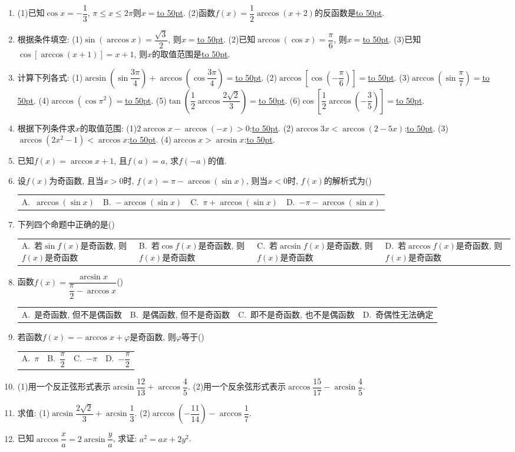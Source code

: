 \documentclass[10pt,a4paper]{article}
\newcommand{\blank}[1]{\underline{\hbox to #1pt{}}}
\newcommand{\fourch}[4]{\par\begin{tabular}{p{.23\textwidth}p{.23\textwidth}p{.23\textwidth}p{.23\textwidth}}
A.~#1 &B.~#2& C.~#3& D.~#4
\end{tabular}}
\begin{document}
\begin{enumerate}[1.]
(3)$y=\arccos \dfrac 2x$, $x\in$\blank{50}, $y\in$\blank{50}.
(4)$y=\arccos (2x^2-x)$, $x\in$\blank{50}, $y\in$\blank{50}.
(5)$y=\sqrt {\dfrac{2\pi }3-\arccos (\dfrac 12x-1)}$, $x\in$\blank{50}, $y\in$\blank{50}.
\item (1)已知$\cos x=-\dfrac 13$, $\pi \le x\le 2\pi$则$x=$\blank{50}.
(2)函数$f(x)=\dfrac 12\arccos (x+2)$的反函数是\blank{50}.
\item 根据条件填空:
(1)$\sin (\arccos x)=\dfrac{\sqrt 3}2$, 则$x=$\blank{50}.
(2)已知$\arccos (\cos x)=\dfrac{\pi }6$, 则$x=$\blank{50}.
(3)已知$\cos [\arccos (x+1)]=x+1$, 则$x$的取值范围是\blank{50}.
\item 计算下列各式:
(1)$\arcsin (\sin \dfrac{3\pi }4)+\arccos (\cos \dfrac{3\pi }4)=$\blank{50}.
(2)$\arccos [\cos (-\dfrac{\pi }6)]=$\blank{50}.
(3)$\arccos (\sin \dfrac{\pi }7)=$\blank{50}.
(4)$\arccos (\cos \pi ^2)=$\blank{50}.
(5)$\tan (\dfrac 12\arccos \dfrac{2\sqrt 2}3)=$\blank{50}.
(6)$\cos [\dfrac 12\arccos (-\dfrac 35)]=$\blank{50}.
\item 根据下列条件求$x$的取值范围:
(1)$2\arccos x-\arccos (-x)>0$:\blank{50}.
(2)$\arccos 3x<\arccos (2-5x)$:\blank{50}.
(3)$\arccos (2x^2-1)<\arccos x$:\blank{50}.
(4)$\arccos x>\arcsin x$:\blank{50}.
\item 已知$f(x)=\arccos x+1$, 且$f(a)=a$, 求$f(-a)$的值.
\item 设$f(x)$为奇函数, 且当$x>0$时, $f(x)=\pi -\arccos (\sin x)$, 则当$x<0$时, $f(x)$的解析式为()
\fourch{$\arccos (\sin x)$}{$-\arccos (\sin x)$}{$\pi +\arccos (\sin x)$}{$-\pi -\arccos (\sin x)$}
\item 下列四个命题中正确的是()
\fourch{若$\sin f(x)$是奇函数, 则$f(x)$是奇函数}{若$\cos f(x)$是奇函数, 则$f(x)$是奇函数}{若$\arcsin f(x)$是奇函数, 则$f(x)$是奇函数}{若$\arccos f(x)$是奇函数, 则$f(x)$是奇函数}
\item 函数$f(x)=\dfrac{\arcsin x}{\dfrac{\pi }2-\arccos x}$()
\fourch{是奇函数, 但不是偶函数}{是偶函数, 但不是奇函数}{即不是奇函数, 也不是偶函数}{奇偶性无法确定}
\item 若函数$f(x)=-\arccos x+\varphi$是奇函数, 则$\varphi$等于()
\fourch{$\pi$}{$\dfrac{\pi }2$}{$-\pi$}{$-\dfrac{\pi }2$}
\item (1)用一个反正弦形式表示$\arcsin \dfrac{12}{13}+\arccos \dfrac 45$.
(2)用一个反余弦形式表示$\arccos \dfrac{15}{17}-\arcsin \dfrac 45$.
\item 求值:
(1)$\arcsin \dfrac{2\sqrt 2}3+\arcsin \dfrac 13$.				(2)$\arccos (-\dfrac{11}{14})-\arccos \dfrac 17$.
\item 已知$\arccos \dfrac xa=2\arcsin \dfrac ya$, 求证: $a^2=ax+2y^2$.

\end{enumerate}
\end{document}
